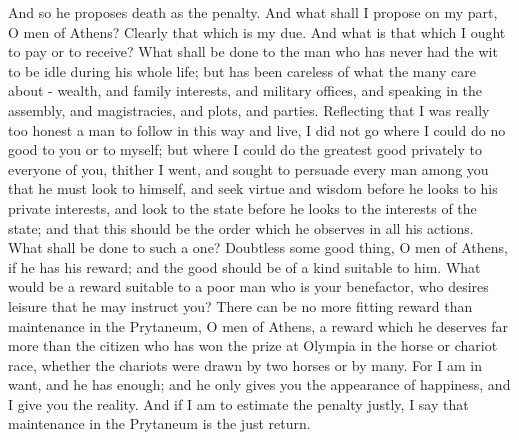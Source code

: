 \documentclass[11pt]{article}
\begin{document}
And so he proposes death as the penalty. And what shall I propose on my part, O men of Athens? Clearly that which is my due. And what is that which I ought to pay or to receive? What shall be done to the man who has never had the wit to be idle during his whole life; but has been careless of what the many care about - wealth, and family interests, and military offices, and speaking in the assembly, and magistracies, and plots, and parties. Reflecting that I was really too honest a man to follow in this way and live, I did not go where I could do no good to you or to myself; but where I could do the greatest good privately to everyone of you, thither I went, and sought to persuade every man among you that he must look to himself, and seek virtue and wisdom before he looks to his private interests, and look to the state before he looks to the interests of the state; and that this should be the order which he observes in all his actions. What shall be done to such a one? Doubtless some good thing, O men of Athens, if he has his reward; and the good should be of a kind suitable to him. What would be a reward suitable to a poor man who is your benefactor, who desires leisure that he may instruct you? There can be no more fitting reward than maintenance in the Prytaneum, O men of Athens, a reward which he deserves far more than the citizen who has won the prize at Olympia in the horse or chariot race, whether the chariots were drawn by two horses or by many. For I am in want, and he has enough; and he only gives you the appearance of happiness, and I give you the reality. And if I am to estimate the penalty justly, I say that maintenance in the Prytaneum is the just return.
\end{document}
